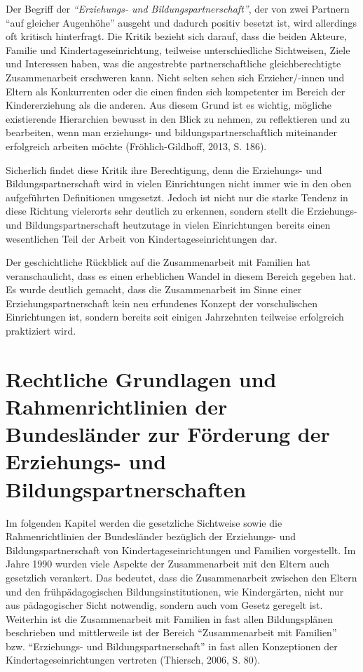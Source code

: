 \documentclass[12pt,a4paper]{article}
\begin{document}
	Der Begriff der \textit{"`Erziehungs- und Bildungspartnerschaft"'}, der von zwei Partnern "`auf gleicher Augenhöhe"' ausgeht und dadurch positiv besetzt ist, wird allerdings oft kritisch hinterfragt. Die Kritik bezieht sich darauf, dass die beiden Akteure, Familie und Kindertageseinrichtung, teilweise unterschiedliche Sichtweisen, Ziele und Interessen haben, was die angestrebte partnerschaftliche gleichberechtigte Zusammenarbeit erschweren kann. Nicht selten sehen sich Erzieher/-innen und Eltern als Konkurrenten oder die einen finden sich kompetenter im Bereich der Kindererziehung als die anderen. Aus diesem Grund ist es wichtig, mögliche existierende Hierarchien bewusst in den Blick zu nehmen, zu reflektieren und zu bearbeiten, wenn man erziehungs- und bildungspartnerschaftlich miteinander erfolgreich arbeiten möchte (Fröhlich-Gildhoff, 2013, S. 186).
	
Sicherlich findet diese Kritik ihre Berechtigung, denn die Erziehungs- und Bildungspartnerschaft wird in vielen Einrichtungen nicht immer wie in den oben aufgeführten Definitionen umgesetzt. Jedoch ist nicht nur die starke Tendenz in diese Richtung vielerorts sehr deutlich zu erkennen, sondern stellt die Erziehungs- und Bildungspartnerschaft heutzutage in vielen Einrichtungen bereits einen wesentlichen Teil der Arbeit von Kindertageseinrichtungen dar.

	Der geschichtliche Rückblick auf die Zusammenarbeit mit Familien hat veranschaulicht, dass es einen erheblichen Wandel in diesem Bereich gegeben hat. Es wurde deutlich gemacht, dass die Zusammenarbeit im Sinne einer Erziehungspartnerschaft kein neu erfundenes Konzept der vorschulischen Einrichtungen ist, sondern bereits seit einigen Jahrzehnten teilweise erfolgreich praktiziert wird.
	
\section{Rechtliche Grundlagen und Rahmenrichtlinien der Bundesländer zur Förderung der Erziehungs- und Bildungspartnerschaften}

Im folgenden Kapitel werden die gesetzliche Sichtweise sowie die Rahmenrichtlinien der Bundesländer bezüglich der Erziehungs- und Bildungspartnerschaft von Kindertageseinrichtungen und Familien vorgestellt.
Im Jahre 1990 wurden viele Aspekte der Zusammenarbeit mit den Eltern auch gesetzlich verankert. Das bedeutet, dass die Zusammenarbeit zwischen den Eltern und den frühpädagogischen Bildungsinstitutionen, wie Kindergärten, nicht nur aus pädagogischer Sicht notwendig, sondern auch vom Gesetz geregelt ist. Weiterhin ist die Zusammenarbeit mit Familien in fast allen Bildungsplänen beschrieben und mittlerweile ist der Bereich "`Zusammenarbeit mit Familien"' bzw. "`Erziehungs- und Bildungspartnerschaft"' in fast allen Konzeptionen der Kindertageseinrichtungen vertreten (Thiersch, 2006, S. 80).
\end{document}
